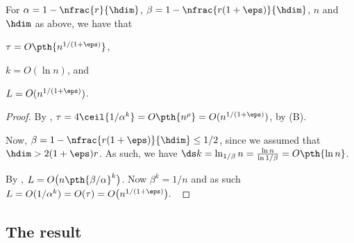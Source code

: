 \begin{lemma}
    For $\alpha = 1-\nfrac{r}{\hdim}$, $\beta = 1 -
    \nfrac{r(1+\eps)}{\hdim}$, $n$ and $\hdim$ as above, we have that
    \begin{enumerate*}[label=\Roman*.]
        \item
        $\tau =O\pth{n^{1/(1+\eps)}}$,
        \item $k = O( \ln n)$, and 
        \item $L = O(n^{1/(1+\eps)})$.
    \end{enumerate*}

\end{lemma}
\begin{proof}
    By ,
    $\tau = 4 \ceil{1/\alpha^k} = O\pth{ n^{\rho} } =
    O(n^{1/(1+\eps)})$, by (B).

    Now, $\beta = 1 - \nfrac{r(1+\eps)}{\hdim} \leq 1/2$, since we
    assumed that $\hdim > 2 (1+\eps)r$. As such, we have $\ds k =
    \ln_{1/\beta} n = \frac{\ln n}{\ln 1/\beta} = O \pth{ \ln n}$.

    By , $L = O\bigl( n \pth{\beta/\alpha}^k
    \bigr)$. Now $\beta^k = 1/n$ and as such
    \begin{math}
        L = O( 1/\alpha^k ) = O(\tau) = O\bigl(n^{1/(1+\eps)}\bigr).
    \end{math}~
\end{proof}




\subsection{The result}

